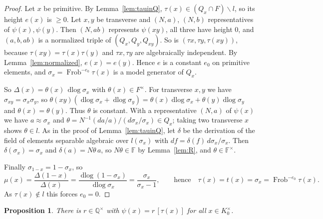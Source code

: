 \documentclass[11pt]{amsart}
\newtheorem{proposition}[theorem]{Proposition}
\theoremstyle{definition}
\theoremstyle{remark}
\newcommand{\QQ}{\mathbb{Q}}
\newcommand{\FF}{\mathbb{F}}
\newcommand{\Frob}{\operatorname{Frob}}
\newcommand{\dlog}{\operatorname{dlog}}
\newcommand{\sm}{\smallsetminus}
\begin{document}
\begin{proof}
Let $x$ be primitive. By Lemma~\ref{lem:tauinQ}, $\tau(x)\in(Q_x\cap F)\sm l$, so its height $e(x)$ is $\ge0$.
Let $x,y$ be transverse and $(N,a)$, $(N,b)$ representatives of $\psi(x),\psi(y)$. Then $(N,ab)$ represents $\psi(xy)$, all three have height $0$, and $(a,b,ab)$ is a normalized triple of $(Q_x,Q_y,Q_{xy})$.
So is $(\tau x,\tau y,\tau(xy))$, because $\tau(xy)=\tau(x)\tau(y)$ and $\tau x,\tau y$ are algebraically independent. By Lemma~\ref{lem:normalized}, $e(x)=e(y)$. Hence $e$ is a constant $e_0$ on primitive elements, and
$\sigma_x=\Frob^{-e_0}\tau(x)$ is a model generator of $Q_x$.

So $\Delta(x)=\theta(x)\,\dlog\sigma_x$ with $\theta(x)\in F^\times$. For transverse $x,y$ we have $\sigma_{xy}=\sigma_x\sigma_y$, so
$\theta(xy)(\dlog\sigma_x+\dlog\sigma_y)=\theta(x)\dlog\sigma_x+\theta(y)\dlog\sigma_y$ and $\theta(x)=\theta(y)$. Thus $\theta$ is constant.
With a representative $(N,a)$ of $\psi(x)$ we have $a\approx\sigma_x$ and $\theta=N^{-1}(da/a)/(d\sigma_x/\sigma_x)\in Q_x$; taking two transverse $x$ shows $\theta\in l$.
As in the proof of Lemma~\ref{lem:tauinQ}, let $\delta$ be the derivation of the field of elements separable algebraic over $l(\sigma_x)$ with $df=\delta(f)\,d\sigma_x/\sigma_x$. Then $\delta(\sigma_x)=\sigma_x$ and $\delta(a)=N\theta\,a$, so $N\theta\in\FF$ by Lemma~\ref{lem:R}, and $\theta\in\FF^\times$.

Finally $\sigma_{1-x}=1-\sigma_x$, so
\[ \mu(x)=\frac{\Delta(1-x)}{\Delta(x)}=\frac{\dlog(1-\sigma_x)}{\dlog\sigma_x}=\frac{\sigma_x}{\sigma_x-1},\qquad\text{hence}\quad \tau(x)=t(x)=\sigma_x=\Frob^{-e_0}\tau(x). \]
As $\tau(x)\notin l$ this forces $e_0=0$.
\end{proof}

\begin{proposition}\label{prop:rational}
There is $r\in\QQ^\times$ with $\psi(x)=r\,[\tau(x)]$ for all $x\in K_0^\times$.
\end{proposition}
\end{document}
